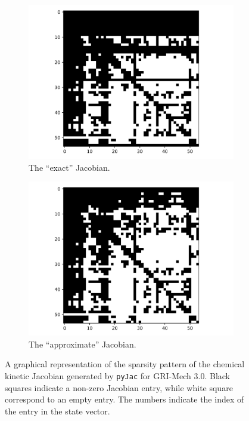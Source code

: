 \documentclass[12pt,number,sort&compress,preprint]{elsarticle}
\begin{document}
\begin{figure}[htb]
  \centering
  \begin{subfigure}[t]{0.48\linewidth}
      \includegraphics[width=\textwidth]{ch4_sparsity_exact.png}
      \caption{The ``exact'' Jacobian.}
      \label{F:jac_sparse_exact}
  \end{subfigure}
  \hfill
  \begin{subfigure}[t]{0.48\linewidth}
      \includegraphics[width=\textwidth]{ch4_sparsity_approximate.png}
      \caption{The ``approximate'' Jacobian.}
      \label{F:jac_sparse_approx}
  \end{subfigure}
  \caption{A graphical representation of the sparsity pattern of the chemical kinetic Jacobian generated by \texttt{pyJac} for GRI-Mech 3.0.
	   Black squares indicate a non-zero Jacobian entry, while white square correspond to an empty entry.
	   The numbers indicate the index of the entry in the state vector.}
  \label{F:jac_sparsity}
\end{figure}
\end{document}
